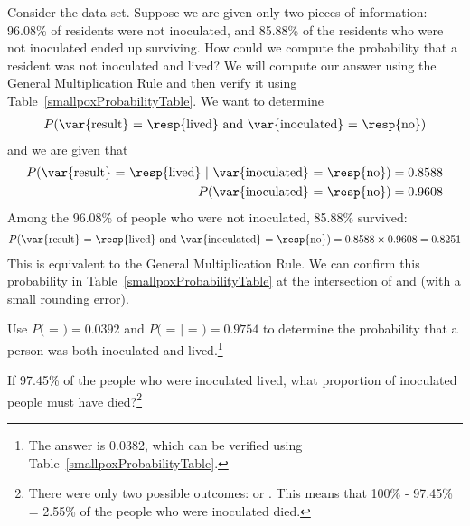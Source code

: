\begin{example}{Consider the  data set. Suppose we are given only two pieces of information: 96.08\% of residents were not inoculated, and 85.88\% of the residents who were not inoculated ended up surviving. How could we compute the probability that a resident was not inoculated and lived?}
We will compute our answer using the General Multiplication Rule and then verify it using Table~\ref{smallpoxProbabilityTable}. We want to determine
\begin{eqnarray*}
P(\text{\var{result} = \resp{lived} and \var{inoculated} = \resp{no}})
\end{eqnarray*}
and we are given that
\begin{eqnarray*}
P(\text{\var{result} = \resp{lived} }|\text{ \var{inoculated} = \resp{no}})=0.8588 \\
P(\text{\var{inoculated} = \resp{no}})=0.9608
\end{eqnarray*}
Among the 96.08\% of people who were not inoculated, 85.88\% survived:
\begin{eqnarray*}
P(\text{\var{result} = \resp{lived} and \var{inoculated} = \resp{no}}) = 0.8588\times 0.9608 = 0.8251
\end{eqnarray*}
This is equivalent to the General Multiplication Rule. We can confirm this probability in Table~\ref{smallpoxProbabilityTable} at the intersection of  and  (with a small rounding error).
\end{example}

\begin{exercise}
Use $P($ = $) = 0.0392$ and $P($ =  $|$  = $) = 0.9754$ to determine the probability that a person was both inoculated and lived.\footnote{The answer is 0.0382, which can be verified using Table~\ref{smallpoxProbabilityTable}.}
\end{exercise}

\begin{exercise}
If 97.45\% of the people who were inoculated lived, what proportion of inoculated people must have died?\footnote{There were only two possible outcomes:  or . This means that 100\% - 97.45\% = 2.55\% of the people who were inoculated died.}
\end{exercise}

